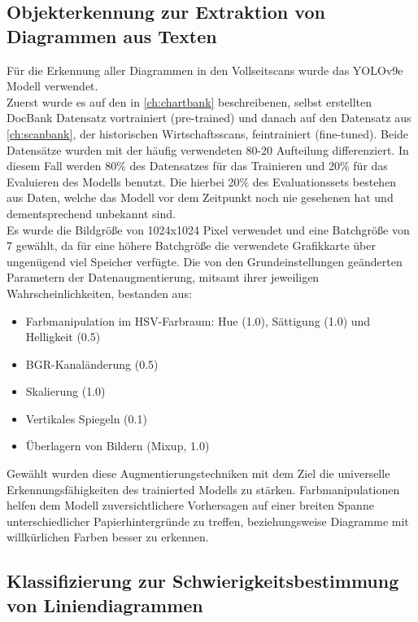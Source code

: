 \subsection{Objekterkennung zur Extraktion von Diagrammen aus Texten}
\label{ch:objectdetection}

Für die Erkennung aller Diagrammen in den Vollseitscans wurde das YOLOv9e Modell verwendet.
\\
Zuerst wurde es auf den in \ref{ch:chartbank} beschreibenen, selbst erstellten DocBank Datensatz vortrainiert (pre-trained) und danach auf den Datensatz aus \ref{ch:scanbank}, der historischen Wirtschaftsscans, feintrainiert (fine-tuned). Beide Datensätze wurden mit der häufig verwendeten 80-20 Aufteilung differenziert. In diesem Fall werden 80\% des Datensatzes für das Trainieren und 20\% für das Evaluieren des Modells benutzt. Die hierbei 20\% des Evaluationssets bestehen aus Daten, welche das Modell vor dem Zeitpunkt noch nie gesehenen hat und dementsprechend unbekannt sind.
\\
Es wurde die Bildgröße von 1024x1024 Pixel verwendet und eine Batchgröße von 7 gewählt, da für eine höhere Batchgröße die verwendete Grafikkarte über ungenügend viel Speicher verfügte. Die von den Grundeinstellungen geänderten Parametern der Datenaugmentierung, mitsamt ihrer jeweiligen Wahrscheinlichkeiten, bestanden aus:

\begin{itemize}[itemsep=0pt, topsep=0pt]
    \item Farbmanipulation im HSV-Farbraum: Hue (1.0), Sättigung (1.0) und Helligkeit (0.5)
    \item BGR-Kanaländerung (0.5)
    \item Skalierung (1.0)
    \item Vertikales Spiegeln (0.1)
    \item Überlagern von Bildern (Mixup, 1.0)
\end{itemize}

Gewählt wurden diese Augmentierungstechniken mit dem Ziel die universelle Erkennungsfähigkeiten des trainierted Modells zu stärken. Farbmanipulationen helfen dem Modell zuversichtlichere Vorhersagen auf einer breiten Spanne unterschiedlicher Papierhintergründe zu treffen, beziehungsweise Diagramme mit willkürlichen Farben besser zu erkennen.

\clearpage


\subsection{Klassifizierung zur Schwierigkeitsbestimmung von Liniendiagrammen}

